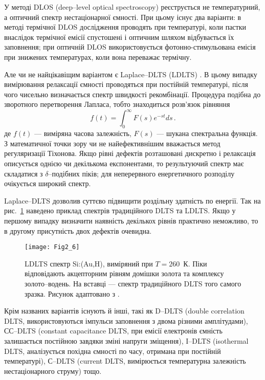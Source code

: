 У методі DLOS (deep--level optical spectroscopy) реєструється не температурний, а оптичний спектр нестаціонарної ємності.
При цьому існує два варіанти:
в методі термічної DLOS дослідження проводять при температурі, коли пастки внаслідок термічної емісії спустошені
і оптичним шляхом відбувається їх заповнення;
при оптичній DLOS використовується фотонно-стимульована емісія при знижених температурах,
коли вона переважає термічну.

Але чи не найцікавіщим варіантом є Laplace--DLTS (LDLTS) \cite{LDLTS2}.
В цьому випадку вимірювання релаксації ємності проводяться при постійній температурі,
після чого чисельно визначається спектр швидкості рекомбінації.
Процедура  подібна до зворотного перетворення Лапласа,
тобто знаходиться розв'язок рівняння
\begin{equation}
\label{DLTSLapl}
f(t)=\int_0^\infty F(s) e^{-st}ds\,.
\end{equation}
де
$f(t)$ --- виміряна часова залежність,
$F(s)$ --- шукана спектральна функція.
З математичної точки зору чи не найефективнішим вважається
метод регуляризації Тіхонова.
Якщо рівні дефектів розташовані дискретно і релаксація описується
однією чи декількома експонентами, то результуючий спектр
має складатися з $\delta$--подібних піків;
для неперервного енергетичного розподілу очікується широкий спектр.

Laplace--DLTS дозволив суттєво підвищити роздільну здатність по енергії.
Так на рис.~\ref{F26} наведено приклад спектрів традиційного DLTS та LDLTS.
Якщо у першому випадку визначити наявність декількох рівнів
практично неможливо, то в другому присутність двох дефектів очевидна.

\begin{figure}[!t]
\center
\vspace{-5mm}
\texttt{[image: Fig2\_6]}
\vspace{-3mm}
\caption{LDLTS спектр Si:(Au,H), виміряний при $T=260$~К.
Піки відповідають акцепторним рівням домішки золота та комплексу
золото--водень.
На вставці --- спектр традиційного DLTS того самого зразка.
Рисунок адаптовано з \cite{Deixler}.
}
\vspace{-3mm}
\label{F26}
\end{figure}

Крім названих варіантів існують й інші, такі як
D--DLTS (double correlation DLTS, використовуються імпульси заповнення з двома різними амплітудами),
СС--DLTS (constant capacitance DLTS, при емісії електронів ємність
залишається постійною завдяки зміні напруги зміщення),
I--DLTS (isothermal DLTS, аналізується похідна ємності по часу, отримана при постійній температурі),
С--DLTS (current DLTS, вимірюється температурна залежність нестаціонарного струму)
тощо.